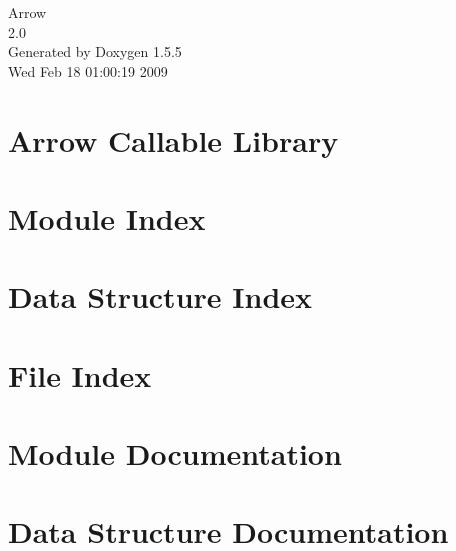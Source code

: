 \documentclass[a4paper]{book}
\begin{document}
\begin{titlepage}
\vspace*{7cm}
\begin{center}
{\Large Arrow \\[1ex]\large 2.0 }\\
\vspace*{1cm}
{\large Generated by Doxygen 1.5.5}\\
\vspace*{0.5cm}
{\small Wed Feb 18 01:00:19 2009}\\
\end{center}
\end{titlepage}
\clearemptydoublepage
{}
\tableofcontents
\clearemptydoublepage
{}
\chapter{Arrow Callable Library }
\label{index}\hypertarget{index}{}
\chapter{Module Index}

\chapter{Data Structure Index}

\chapter{File Index}

\chapter{Module Documentation}


\chapter{Data Structure Documentation}






















\end{document}
